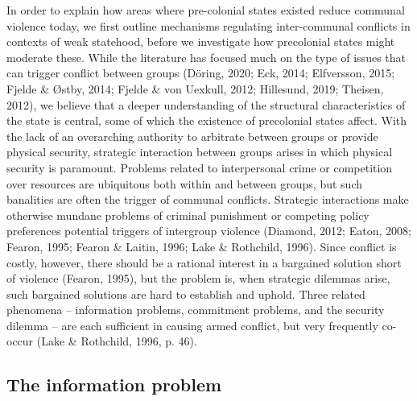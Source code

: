 \documentclass[12pt]{article}
\begin{document}
In order to explain how areas where pre-colonial states existed reduce communal
violence today, we first outline mechanisms regulating inter-communal conflicts
in contexts of weak statehood, before we investigate how precolonial states
might moderate these. While the literature has focused much on the type of
issues that can trigger conflict between groups (Döring, 2020; Eck, 2014;
Elfversson, 2015; Fjelde \& Østby, 2014; Fjelde \& von Uexkull, 2012; Hillesund,
2019; Theisen, 2012), we believe that a deeper understanding of the structural
characteristics of the state is central, some of which the existence of
precolonial states affect. With the lack of an overarching authority to
arbitrate between groups or provide physical security, strategic interaction
between groups arises in which physical security is paramount. Problems related
to interpersonal crime or competition over resources are ubiquitous both within
and between groups, but such banalities are often the trigger of communal
conflicts. Strategic interactions make otherwise mundane problems of criminal
punishment or competing policy preferences potential triggers of intergroup
violence (Diamond, 2012; Eaton, 2008; Fearon, 1995; Fearon \& Laitin, 1996; Lake
							  \& Rothchild, 1996).
Since conflict is costly, however, there should be a rational interest in a
bargained solution short of violence (Fearon, 1995), but the problem is, when
strategic dilemmas arise, such bargained solutions are hard to establish and
uphold. Three related phenomena – information problems, commitment problems, and
the security dilemma – are each sufficient in causing armed conflict, but very
frequently co-occur (Lake \& Rothchild, 1996, p. 46).

\subsection{The information problem}
\end{document}
